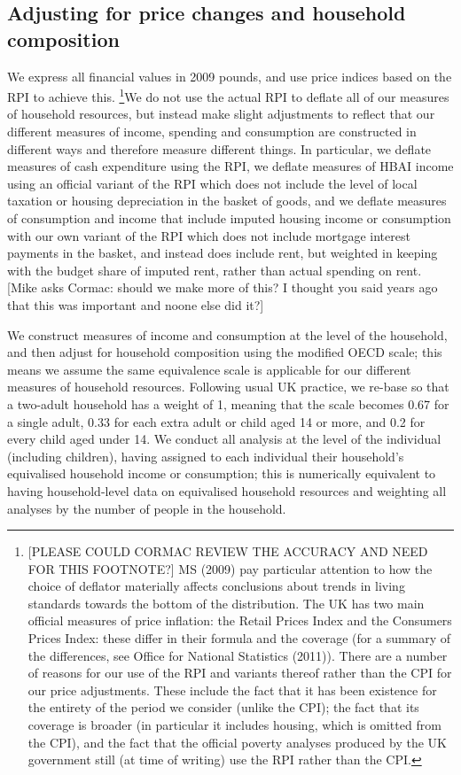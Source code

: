 \subsection{Adjusting for price changes and household composition}
We express all financial values in 2009 pounds, and use price indices based on the RPI to achieve this. \footnote{[PLEASE COULD CORMAC REVIEW THE ACCURACY AND NEED FOR THIS FOOTNOTE?] MS (2009) pay particular attention to how the choice of deflator materially affects conclusions about trends in living standards towards the bottom of the distribution. The UK has two main official measures of price inflation: the Retail Prices Index and the Consumers Prices Index: these differ in their formula and the coverage (for a summary of the differences, see Office for National Statistics (2011)). There are a number of reasons for our use of the RPI and variants thereof rather than the CPI for our price adjustments. These include the fact that it has been existence for the entirety of the period we consider (unlike the CPI); the fact that its coverage is broader (in particular it includes housing, which is omitted from the CPI), and the fact that the official poverty analyses produced by the UK government still (at time of writing) use the RPI rather than the CPI.}We do not use the actual RPI to deflate all of our measures of household resources, but instead make slight adjustments to reflect that our different measures of income, spending and consumption are constructed in different ways and therefore measure different things. In particular, we deflate measures of 
cash expenditure using the RPI, we deflate measures of HBAI income using an official variant of the RPI which does not include the level of local taxation or housing depreciation in the basket of goods, and we deflate measures of consumption and income that include imputed housing income or consumption with our own variant of the RPI which does not include mortgage interest payments in the basket, and instead does include rent, but weighted in keeping with the budget share of imputed rent, rather than actual spending on rent. [Mike asks Cormac: should we make more of this? I thought you said years ago that this was important and noone else did it?]

We construct measures of income and consumption at the level of the household, and then adjust for household composition using the modified OECD scale; this means we assume the same equivalence scale is applicable for our different measures of household resources. Following usual UK practice, we re-base so that a two-adult household has a weight of 1, meaning that the scale becomes 0.67 for a single adult, 0.33 for each extra adult or child aged 14 or more, and 0.2 for every child aged under 14. We conduct all analysis at the level of the individual (including children), having assigned to each individual their household's equivalised household income or consumption; this is numerically equivalent to having household-level data on equivalised household resources and weighting all analyses by the number of people in the household.

